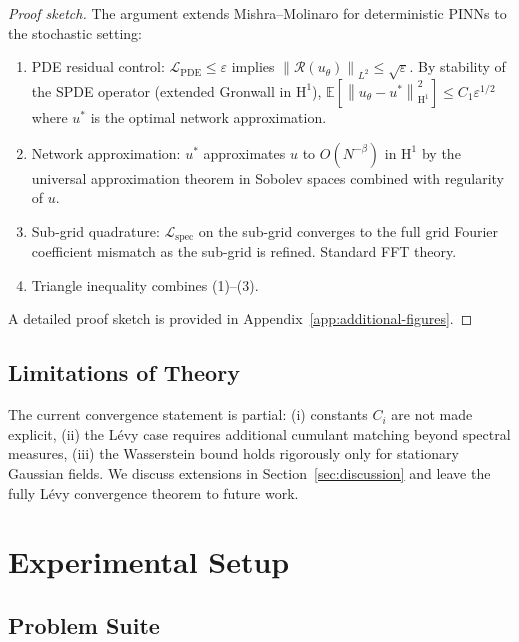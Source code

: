 \documentclass[times,12pt]{elsarticle}
\newcommand{\bbE}{\mathbb{E}}
\newcommand{\norm}[1]{\left\|#1\right\|}
\newcommand{\Sobolev}[1]{\mathrm{H}^{#1}}
\begin{document}
\begin{proof}[Proof sketch]
The argument extends Mishra--Molinaro \cite{MishraMolinaro2022} for deterministic PINNs to the stochastic setting:
\begin{enumerate}
    \item PDE residual control: $\mathcal{L}_{\text{PDE}} \leq \varepsilon$ implies $\norm{\mathcal{R}(u_\theta)}_{L^2} \leq \sqrt{\varepsilon}$. By stability of the SPDE operator (extended Gronwall in $\Sobolev{1}$), $\bbE[\norm{u_\theta - u^*}^2_{\Sobolev{1}}] \leq C_1 \varepsilon^{1/2}$ where $u^*$ is the optimal network approximation.
    \item Network approximation: $u^*$ approximates $u$ to $O(N^{-\beta})$ in $\Sobolev{1}$ by the universal approximation theorem in Sobolev spaces \cite{Pinkus1999} combined with regularity of $u$.
    \item Sub-grid quadrature: $\mathcal{L}_{\text{spec}}$ on the sub-grid converges to the full grid Fourier coefficient mismatch as the sub-grid is refined. Standard FFT theory.
    \item Triangle inequality combines (1)--(3).
\end{enumerate}
A detailed proof sketch is provided in Appendix~\ref{app:additional-figures}.
\end{proof}

\subsection{Limitations of Theory}

The current convergence statement is partial: (i) constants $C_i$ are not made explicit, (ii) the L\'evy case requires additional cumulant matching beyond spectral measures, (iii) the Wasserstein bound holds rigorously only for stationary Gaussian fields. We discuss extensions in Section~\ref{sec:discussion} and leave the fully L\'evy convergence theorem to future work.


\section{Experimental Setup}
\label{sec:experiments}

\subsection{Problem Suite}
\end{document}
